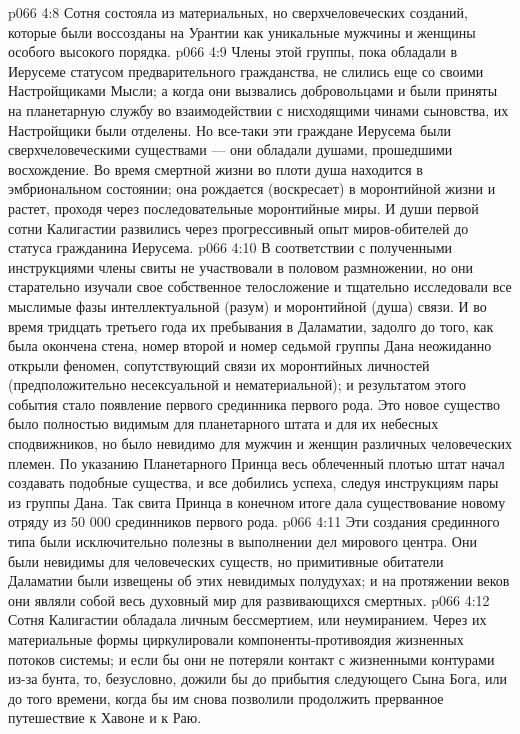 \vs p066 4:8 \pc {}\bibnobreakspace Сотня состояла из материальных, но сверхчеловеческих созданий, которые были воссозданы на Урантии как уникальные мужчины и женщины особого высокого порядка.
\vs p066 4:9 Члены этой группы, пока обладали в Иерусеме статусом предварительного гражданства, не слились еще со своими Настройщиками Мысли; а когда они вызвались добровольцами и были приняты на планетарную службу во взаимодействии с нисходящими чинами сыновства, их Настройщики были отделены. Но все\hyp{}таки эти граждане Иерусема были сверхчеловеческими существами --- они обладали душами, прошедшими восхождение. Во время смертной жизни во плоти душа находится в эмбриональном состоянии; она рождается (воскресает) в моронтийной жизни и растет, проходя через последовательные моронтийные миры. И души первой сотни Калигастии развились через прогрессивный опыт миров\hyp{}обителей до статуса гражданина Иерусема.
\vs p066 4:10 В соответствии с полученными инструкциями члены свиты не участвовали в половом размножении, но они старательно изучали свое собственное телосложение и тщательно исследовали все мыслимые фазы интеллектуальной (разум) и моронтийной (душа) связи. И во время тридцать третьего года их пребывания в Даламатии, задолго до того, как была окончена стена, номер второй и номер седьмой группы Дана неожиданно открыли феномен, сопутствующий связи их моронтийных личностей (предположительно несексуальной и нематериальной); и результатом этого события стало появление первого срединника первого рода. Это новое существо было полностью видимым для планетарного штата и для их небесных сподвижников, но было невидимо для мужчин и женщин различных человеческих племен. По указанию Планетарного Принца весь облеченный плотью штат начал создавать подобные существа, и все добились успеха, следуя инструкциям пары из группы Дана. Так свита Принца в конечном итоге дала существование новому отряду из 50 000 срединников первого рода.
\vs p066 4:11 Эти создания срединного типа были исключительно полезны в выполнении дел мирового центра. Они были невидимы для человеческих существ, но примитивные обитатели Даламатии были извещены об этих невидимых полудухах; и на протяжении веков они являли собой весь духовный мир для развивающихся смертных.
\vs p066 4:12 \pc {}\bibnobreakspace Сотня Калигастии обладала личным бессмертием, или неумиранием. Через их материальные формы циркулировали компоненты\hyp{}противоядия жизненных потоков системы; и если бы они не потеряли контакт с жизненными контурами из\hyp{}за бунта, то, безусловно, дожили бы до прибытия следующего Сына Бога, или до того времени, когда бы им снова позволили продолжить прерванное путешествие к Хавоне и к Раю.
